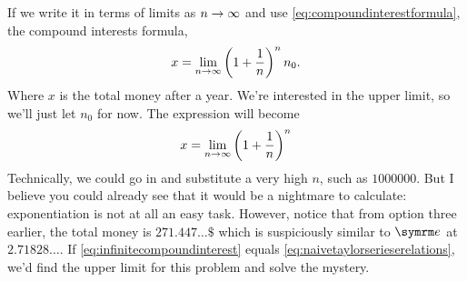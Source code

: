 If we write it in terms of limits as $n \rightarrow \infty$ and use \cref{eq:compoundinterestformula}, the compound interests formula,
\begin{equation*}
  x = \lim_{n \rightarrow \infty}\left(1 + \frac{1}{n}\right)^nn_0.
\end{equation*}
Where $x$ is the total money after a year. We're interested in the upper limit, so we'll just let $n_0$ for now. The expression will become
\begin{equation}
  x = \lim_{n \rightarrow \infty}\left(1 + \frac{1}{n}\right)^n \label{eq:infinitecompoundinterest}
\end{equation}
Technically, we could go in and substitute a very high $n$, such as $1000000$. But I believe you could already see that it would be a nightmare to calculate: exponentiation is not at all an easy task. However, notice that from option three earlier, the total money is $271.447\dots\$$ which is suspiciously similar to $\e$ at $2.71828\dots$. If \cref{eq:infinitecompoundinterest} equals \cref{eq:naivetaylorserieserelations}, we'd find the upper limit for this problem and solve the mystery.

